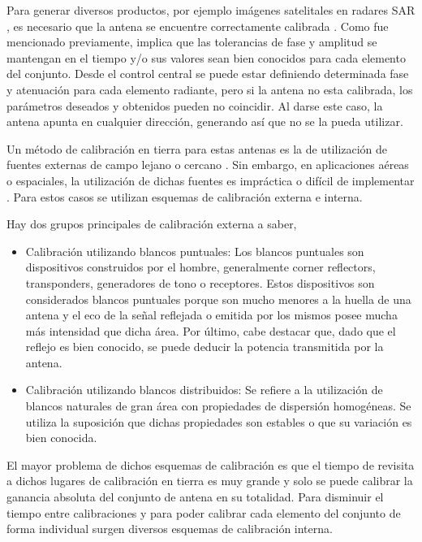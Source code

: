 Para generar diversos productos, por ejemplo imágenes satelitales en radares SAR \cite{Freeman1992}, es necesario que la
antena se encuentre correctamente calibrada \cite{Luscombe1990}\cite{Seifert1996}\cite{Dall1994}. Como fue mencionado 
previamente, implica que las tolerancias de fase y amplitud se mantengan en el tiempo y/o sus valores sean bien conocidos para
cada elemento del conjunto. Desde el control central se puede estar definiendo determinada fase y atenuación para cada elemento
radiante, pero si la antena no esta calibrada, los parámetros deseados y obtenidos pueden no coincidir. Al darse este caso, la
antena apunta en cualquier dirección, generando así que no se la pueda utilizar.

Un método de calibración en tierra para estas antenas es la de utilización de fuentes externas de campo lejano o cercano
\cite{Agrawal2003}. Sin embargo, en aplicaciones aéreas o espaciales, la utilización de dichas fuentes es impráctica o
difícil de implementar \cite{Aumann1989}. Para estos casos se utilizan esquemas de calibración externa e interna.

Hay dos grupos principales de calibración externa a saber,
\begin{itemize}
	\item Calibración utilizando blancos puntuales: Los blancos puntuales son dispositivos construidos por el hombre, generalmente
		corner reflectors, transponders, generadores de tono o receptores. Estos dispositivos son considerados blancos puntuales porque
		son mucho menores a la huella de una antena y el eco de la señal reflejada o emitida por los mismos posee mucha más intensidad
		que dicha área. Por último, cabe destacar que, dado que el reflejo es bien conocido, se puede deducir la potencia transmitida
		por la antena. 
	\item Calibración utilizando blancos distribuidos: Se refiere a la utilización de blancos naturales de gran área con 
		propiedades de dispersión homogéneas. Se utiliza la suposición que dichas propiedades son estables o que su variación es
		bien conocida.
\end{itemize}

El mayor problema de dichos esquemas de calibración es que el tiempo de revisita a dichos lugares de calibración en tierra es muy
grande y solo se puede calibrar la ganancia absoluta del conjunto de antena en su totalidad. Para disminuir el tiempo entre
calibraciones y para poder calibrar cada elemento del conjunto de forma individual surgen diversos esquemas de calibración
interna.


